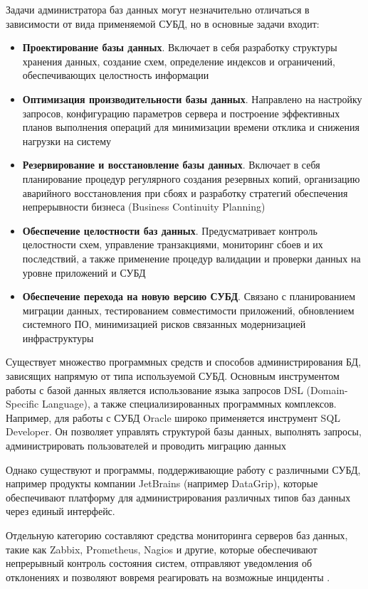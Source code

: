 Задачи администратора баз данных могут незначительно отличаться в зависимости от вида применяемой СУБД, но в основные задачи входит:
\begin{itemize}
    \item \textbf{Проектирование базы данных}. Включает в себя разработку структуры хранения данных, создание схем, определение индексов и ограничений, обеспечивающих целостность информации \autocite{GarciaMolina}
    \item \textbf{Оптимизация производительности базы данных}. Направлено на настройку запросов, конфигурацию параметров сервера и построение эффективных планов выполнения операций для минимизации времени отклика и снижения нагрузки на систему \autocite{OszuValduriez}
    \item \textbf{Резервирование и восстановление базы данных}. Включает в себя планирование процедур регулярного создания резервных копий, организацию аварийного восстановления при сбоях и разработку стратегий обеспечения непрерывности бизнеса (Business Continuity Planning) \autocite{Bernstein}
    \item \textbf{Обеспечение целостности баз данных}. Предусматривает контроль целостности схем, управление транзакциями, мониторинг сбоев и их последствий, а также применение процедур валидации и проверки данных на уровне приложений и СУБД
    \item \textbf{Обеспечение перехода на новую версию СУБД}. Связано с планированием миграции данных, тестированием совместимости приложений, обновлением системного ПО, минимизацией рисков связанных модернизацией инфраструктуры
\end{itemize}

Существует множество программных средств и способов администрирования БД, зависящих напрямую от типа используемой СУБД. Основным инструментом работы с базой данных является использование языка запросов DSL (Domain-Specific Language), а также специализированных программных комплексов. Например, для работы с СУБД Oracle широко применяется инструмент SQL Developer. Он позволяет управлять структурой базы данных, выполнять запросы, администрировать пользователей и проводить миграцию данных \autocite{SQLDeveloper}

Однако существуют и программы, поддерживающие работу с различными СУБД, например продукты компании JetBrains (например DataGrip), которые обеспечивают платформу для администрирования различных типов баз данных через единый интерфейс.

Отдельную категорию составляют средства мониторинга серверов баз данных, такие как Zabbix, Prometheus, Nagios и другие, которые обеспечивают непрерывный контроль состояния систем, отправляют уведомления об отклонениях и позволяют вовремя реагировать на возможные инциденты \autocite{SameerParadkar}.

